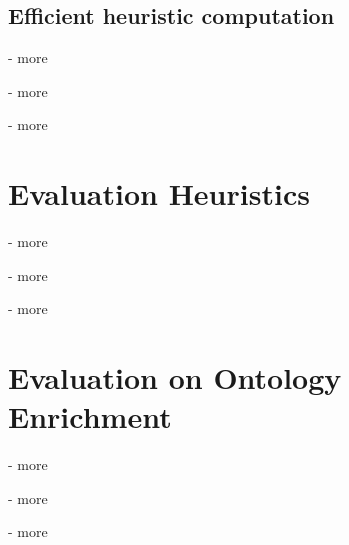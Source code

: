 \subsection{Efficient heuristic computation}
- more

- more

- more




\section{Evaluation Heuristics}
- more

- more

- more




\section{Evaluation on Ontology Enrichment}
- more

- more

- more


